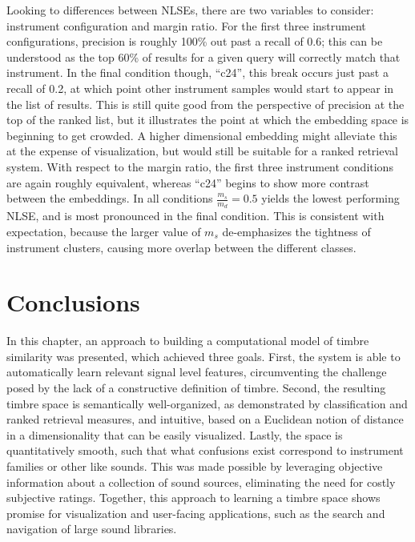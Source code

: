Looking to differences between NLSEs, there are two variables to consider: instrument configuration and margin ratio.
For the first three instrument configurations, precision is roughly 100\% out past a recall of 0.6;
this can be understood as the top 60\% of results for a given query will correctly match that instrument.
In the final condition though, ``c24'', this break occurs just past a recall of 0.2, at which point other instrument samples would start to appear in the list of results.
This is still quite good from the perspective of precision at the top of the ranked list, but it illustrates the point at which the embedding space is beginning to get crowded.
A higher dimensional embedding might alleviate this at the expense of visualization, but would still be suitable for a ranked retrieval system.
With respect to the margin ratio, the first three instrument conditions are again roughly equivalent, whereas ``c24'' begins to show more contrast between the embeddings.
In all conditions $\frac{m_s}{m_d} = 0.5$ yields the lowest performing NLSE, and is most pronounced in the final condition.
This is consistent with expectation, because the larger value of $m_s$ de-emphasizes the tightness of instrument clusters, causing more overlap between the different classes.


\section{Conclusions}
\label{sec:conclusions}

In this chapter, an approach to building a computational model of timbre similarity was presented, which achieved three goals.
First, the system is able to automatically learn relevant signal level features, circumventing the challenge posed by the lack of a constructive definition of timbre.
Second, the resulting timbre space is semantically well-organized, as demonstrated by classification and ranked retrieval measures, and intuitive, based on a Euclidean notion of distance in a dimensionality that can be easily visualized.
Lastly, the space is quantitatively smooth, such that what confusions exist correspond to instrument families or other like sounds.
This was made possible by leveraging objective information about a collection of sound sources, eliminating the need for costly subjective ratings.
Together, this approach to learning a timbre space shows promise for visualization and user-facing applications, such as the search and navigation of large sound libraries.

